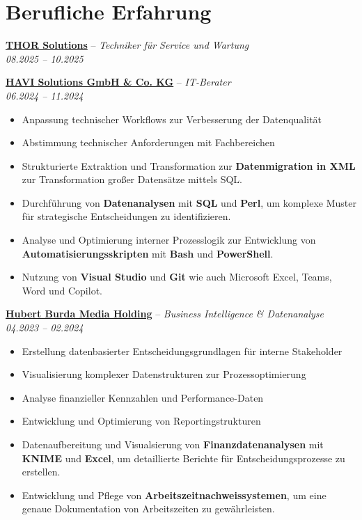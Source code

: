 \documentclass[a4paper,10pt]{article}
\begin{document}
\vspace{5pt}

\section*{Berufliche Erfahrung}

\noindent\textbf{\href{https://www.thormontagen.de/}{THOR Solutions}} -- \textit{Techniker für Service und Wartung} \\
\textit{08.2025 – 10.2025}  

\vspace{5pt}

\noindent\textbf{\href{https://www.havi.com/}{HAVI Solutions GmbH \& Co. KG}} -- \textit{IT-Berater} \\
\textit{06.2024 – 11.2024}  
\begin{itemize}
    \item[\faProjectDiagram] Anpassung technischer Workflows zur Verbesserung der Datenqualität
    \item[\faUsers] Abstimmung technischer Anforderungen mit Fachbereichen
    \item[\faTerminal] Strukturierte Extraktion und Transformation zur \textbf{Datenmigration in XML} zur Transformation großer Datensätze mittels SQL.
    \item[\faDatabase] Durchführung von \textbf{Datenanalysen} mit \textbf{SQL} und \textbf{Perl}, um komplexe Muster für strategische Entscheidungen zu identifizieren.
    \item[\faCogs] Analyse und Optimierung interner Prozesslogik zur Entwicklung von \textbf{Automatisierungsskripten} mit \textbf{Bash} und \textbf{PowerShell}.
    \item[\faTools] Nutzung von \textbf{Visual Studio} und \textbf{Git} wie auch Microsoft Excel, Teams, Word und Copilot.
\end{itemize}

\newpage

\noindent\textbf{\href{https://www.burda.com/}{Hubert Burda Media Holding}} -- \textit{Business Intelligence \& Datenanalyse} \\
\textit{04.2023 – 02.2024}  
\begin{itemize}
    \item[\faProjectDiagram] Erstellung datenbasierter Entscheidungsgrundlagen für interne Stakeholder
    \item[\faChartBar] Visualisierung komplexer Datenstrukturen zur Prozessoptimierung
    \item[\faSignal] Analyse finanzieller Kennzahlen und Performance-Daten
    \item[\faChartLine] Entwicklung und Optimierung von Reportingstrukturen 
    \item[\faFileCsv] Datenaufbereitung und Visualsierung von \textbf{Finanzdatenanalysen} mit \textbf{KNIME} und \textbf{Excel}, um detaillierte Berichte für Entscheidungsprozesse zu erstellen.
    \item[\faFileExcel] Entwicklung und Pflege von \textbf{Arbeitszeitnachweissystemen}, um eine genaue Dokumentation von Arbeitszeiten zu gewährleisten.
\end{itemize}
\end{document}
